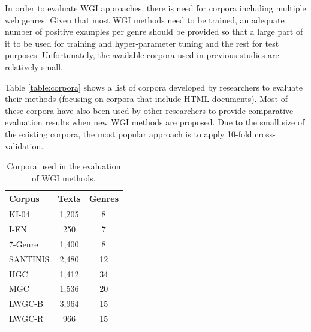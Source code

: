 In order to evaluate WGI approaches, there is need for corpora including multiple web genres. Given that most WGI methods need to be trained, an adequate number of positive examples per genre should be provided so that a large part of it to be used for training and hyper-parameter tuning and the rest for test purposes. Unfortunately, the available corpora used in previous studies are relatively small. 

Table \ref{table:corpora} shows a list of corpora developed by researchers to evaluate their methods (focusing on corpora that include HTML documents). Most of these corpora have also been used by other researchers to provide comparative evaluation results when new WGI methods are proposed. Due to the small size of the existing corpora, the most popular approach is to apply 10-fold cross-validation.

\begin{table}[t]
	\center
	\caption {Corpora used in the evaluation of WGI methods.}
	\begin{tabular}{lcc}
		\hline
		Corpus & Texts & Genres \\
		\hline
        KI-04 & 1,205 & 8 \\
        I-EN & 250 & 7 \\
        7-Genre & 1,400 & 8 \\
        SANTINIS & 2,480 & 12 \\
        HGC & 1,412 & 34 \\
        MGC & 1,536 & 20 \\
        LWGC-B & 3,964 & 15 \\
        LWGC-R & 966 & 15 \\
  		\hline
	\end{tabular}
\end{table}

